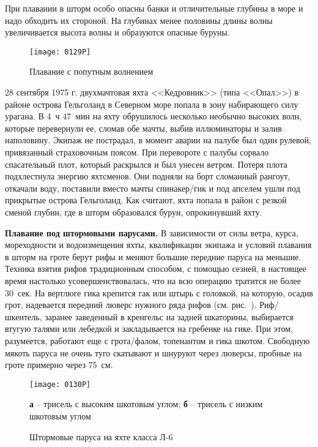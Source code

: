 При плавании в шторм особо опасны банки и отличительные глубины в море и надо обходить их стороной. На глубинах менее половины длины волны увеличивается высота волны и образуются опасные буруны.

\begin{figure*}[htb]
  \centering{}
  \texttt{[image: 0129P]}
  \caption{Плавание с попутным волнением}
  \label{fig:129}
\end{figure*}

{\small 28 сентября 1975 г. двухмачтовая яхта <<Кедровник>> (типа <<Опал>>) в районе острова Гельголанд в Северном море попала в зону набирающего силу урагана. В 4~ч 47~мин на яхту обрушилось несколько необычно высоких волн, которые перевернули ее, сломав обе мачты, выбив иллюминаторы и залив наполовину. Экипаж не пострадал, в момент аварии на палубе был один рулевой, привязанный страховочным поясом. При перевороте с палубы сорвало спасательный плот, который раскрылся и был унесен ветром. Потеря плота подхлестнула энергию яхтсменов. Они подняли на борт сломанный рангоут, откачали воду, поставили вместо мачты спинакер\-/гик и под апселем ушли под прикрытые острова Гельголанд. Как считают, яхта попала в район с резкой сменой глубин, где в шторм образовался бурун, опрокинувший яхту.}

\textbf{Плавание под штормовыми парусами.} В зависимости от силы ветра, курса, мореходности и водоизмещения яхты, квалификации экипажа и условий плавания в шторм на гроте берут рифы и меняют большие передние паруса на меньшие. Техника взятия рифов традиционным способом, с помощью сезней, в настоящее время настолько усовершенствовалась, что на всю операцию тратится не более 30~сек. На вертлюге гика крепится гак или штырь с головкой, на которую, осадив грот, надевается передний люверс нужного ряда рифов (см. рис.~). Риф\-/шкентель, заранее заведенный в кренгельс на задней шкаторины, выбирается втугую талями или лебедкой и закладывается на гребенке на гике. При этом, разумеется, работают еще с грота\-/фалом, топенантом и гика шкотом. Свободную мякоть паруса не очень туго скатывают и шнуруют через люверсы, пробные на гроте примерно через 75~см. 

\begin{figure}[htb]
  \centering{}
  \texttt{[image: 0130P]}
  \caption{Штормовые паруса на яхте класса Л-6}
  \label{fig:130}
  \small
  \centering{}
  \textbf{а} \--- трисель с высоким шкотовым углом; \textbf{б} \--- трисель с низким шкотовым углом
\end{figure}

